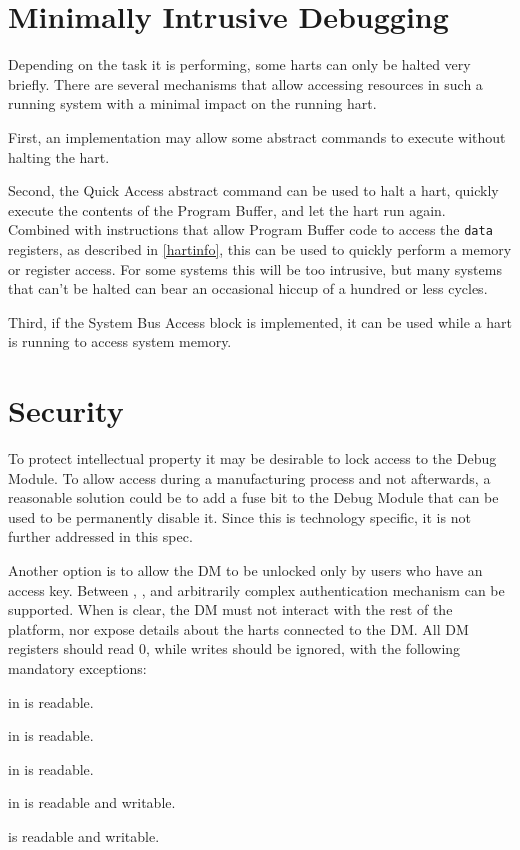 \section{Minimally Intrusive Debugging}

Depending on the task it is performing, some harts can only be halted very briefly.
There are several mechanisms that allow accessing resources in such a running system
with a minimal impact on the running hart.

First, an implementation may allow some abstract commands to execute without halting the hart.

Second, the Quick Access abstract command can be used to halt a hart, quickly
execute the contents of the Program Buffer, and let the hart run again.
Combined with instructions that allow Program Buffer code to access the
{\tt data} registers, as described in \ref{hartinfo}, this can be used to quickly
perform a memory or register access. For some systems this will be too
intrusive, but many systems that can't be halted can bear an occasional hiccup
of a hundred or less cycles.

Third, if the System Bus Access block is implemented, it can be used while a
hart is running to access system memory.

\section{Security}

To protect intellectual property it may be desirable to lock access to the
Debug Module.  To allow access during a manufacturing process and not
afterwards, a reasonable solution could be to add a fuse bit to the Debug
Module that can be used to be permanently disable it. Since this is technology
specific, it is not further addressed in this spec.

Another option is to allow the DM to be unlocked only by users who have an
access key. Between \Fauthenticated, \Fauthbusy, and \Rauthdata arbitrarily
complex authentication mechanism can be supported.  When \Fauthenticated is
clear, the DM must not interact with the rest of the platform, nor expose
details about the harts connected to the DM. All DM registers should read 0,
while writes should be ignored, with the following mandatory exceptions:
\begin{steps}{}
    \item \Fauthenticated in \Rdmstatus is readable.
    \item \Fauthbusy in \Rdmstatus is readable.
    \item \Fversion in \Rdmstatus is readable.
    \item \Fdmactive in \Rdmcontrol is readable and writable.
    \item \Rauthdata is readable and writable.
\end{steps}

